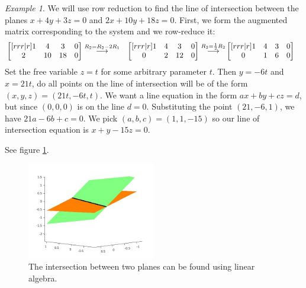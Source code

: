 \documentclass[10pt, a4paper]{amsart}
\newcommand{\grstep}[2][\relax]{%
   \ensuremath{\mathrel{
       {\mathop{\longrightarrow}\limits^{#2\mathstrut}_{
                                     \begin{subarray}{l} #1 \end{subarray}}}}}}
\theoremstyle{definition}
\theoremstyle{remark}
\newtheorem{ex}{Example}
\begin{document}
\begin{ex}
  We will use row reduction to find the line of intersection between the
  planes $ x + 4y + 3z = 0 $ and $ 2x + 10y + 18z = 0 $. First, we form
  the augmented matrix corresponding to the system and we row-reduce it:
  \begin{align*}
    &\begin{bmatrix}[rrr|r]
        1 &  4 &  3 & 0\\
        2 & 10 & 18 & 0
    \end{bmatrix}
    \grstep{R_2 = R_2 - 2R_1}
    &\begin{bmatrix}[rrr|r]
        1 &  4 &  3 & 0\\
        0 &  2 & 12 & 0
    \end{bmatrix}
    \grstep{R_2 = \frac{1}{2}R_2}
    &\begin{bmatrix}[rrr|r]
        1 &  4 &  3 & 0\\
        0 &  1 & 6 & 0
    \end{bmatrix}
  \end{align*}
  Set the free variable $ z = t $ for some arbitrary parameter $ t $. Then $ y = -6t $ and $ x = 21t $,
  do all points on the line of intersection will be of the form $ (x,y,z) = (21t, -6t, t) $. We want a
  line equation in the form $ ax + by + cz = d $, but since $ (0,0,0) $ is on the line $ d = 0 $.
  Substituting the point $ (21, -6, 1) $, we have $ 21a - 6b + c = 0 $. We pick $ (a,b,c) = (1, 1, -15) $
  so our line of intersection equation is $ x + y - 15z = 0 $.

  See figure \ref{fig:PlaneIntersection}.

  \begin{figure}
    \includegraphics[width=0.5\textwidth]{planeintersection}
    \caption{The intersection between two planes can be found using linear algebra.}
    \label{fig:PlaneIntersection}
  \end{figure}
\end{ex}
\end{document}
